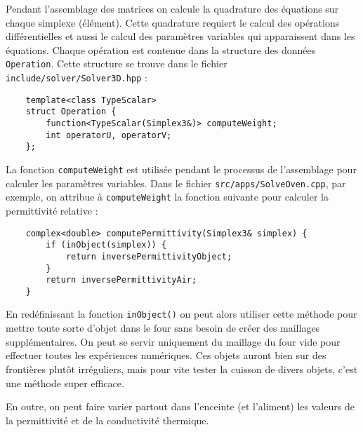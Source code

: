 Pendant l'assemblage des matrices on calcule la quadrature des
équations sur chaque simplexe (élément). Cette quadrature requiert
le calcul des opérations différentielles et aussi le calcul des paramètres
variables qui apparaissent dans les équations. Chaque opération est
contenue dans la structure des données \verb|Operation|. Cette
structure se trouve dans le fichier \verb|include/solver/Solver3D.hpp| :

\begin{verbatim}
    template<class TypeScalar>
    struct Operation {
        function<TypeScalar(Simplex3&)> computeWeight;
        int operatorU, operatorV;
    };
\end{verbatim}

La fonction \verb|computeWeight| est utilisée pendant le processus
de l'assemblage pour calculer les paramètres variables. Dans le fichier
\verb|src/apps/SolveOven.cpp|, par exemple, on attribue à
\verb|computeWeight| la fonction suivante pour calculer la permittivité
relative :

\begin{verbatim}
    complex<double> computePermittivity(Simplex3& simplex) {
        if (inObject(simplex)) {
            return inversePermittivityObject;
        }
        return inversePermittivityAir;
    }
\end{verbatim}

En redéfinissant la fonction \verb|inObject()| on peut alors utiliser
cette méthode pour mettre toute sorte
d'objet dans le four sans besoin de créer des maillages supplémentaires.
On peut se servir uniquement du maillage du four vide pour effectuer
toutes les expériences numériques. Ces objets auront bien sur des
frontières plutôt irréguliers, mais pour vite tester la cuisson
de divers objets, c'est une méthode super efficace.

En outre, on peut faire varier partout dans l'enceinte (et l'aliment)
les valeurs de la permittivité et de la conductivité thermique.

